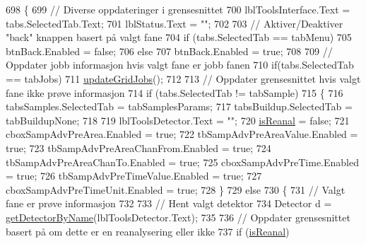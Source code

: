 \begin{DoxyCode}
698         \{
699             \textcolor{comment}{// Diverse oppdateringer i grensesnittet}
700             lblToolsInterface.Text = tabs.SelectedTab.Text;
701             lblStatus.Text = \textcolor{stringliteral}{""};
702 
703             \textcolor{comment}{// Aktiver/Deaktiver "back" knappen basert på valgt fane}
704             \textcolor{keywordflow}{if} (tabs.SelectedTab == tabMenu)
705                 btnBack.Enabled = \textcolor{keyword}{false};
706             \textcolor{keywordflow}{else}
707                 btnBack.Enabled = \textcolor{keyword}{true};
708 
709             \textcolor{comment}{// Oppdater jobb informasjon hvis valgt fane er jobb fanen}
710             \textcolor{keywordflow}{if}(tabs.SelectedTab == tabJobs)
711                 \hyperlink{class_scintilab_1_1_form_main_a26420269c1a616c31de7521deebbef5f}{updateGridJobs}();
712 
713             \textcolor{comment}{// Oppdater grensesnittet hvis valgt fane ikke prøve informasjon}
714             \textcolor{keywordflow}{if} (tabs.SelectedTab != tabSample)
715             \{
716                 tabsSamples.SelectedTab = tabSamplesParams;
717                 tabsBuildup.SelectedTab = tabBuildupNone;
718 
719                 lblToolsDetector.Text = \textcolor{stringliteral}{""};
720                 \hyperlink{class_scintilab_1_1_form_main_a389e9c6697c567d84058d178053a837c}{isReanal} = \textcolor{keyword}{false};
721                 cboxSampAdvPreArea.Enabled = \textcolor{keyword}{true};
722                 tbSampAdvPreAreaValue.Enabled = \textcolor{keyword}{true};
723                 tbSampAdvPreAreaChanFrom.Enabled = \textcolor{keyword}{true};
724                 tbSampAdvPreAreaChanTo.Enabled = \textcolor{keyword}{true};
725                 cboxSampAdvPreTime.Enabled = \textcolor{keyword}{true};
726                 tbSampAdvPreTimeValue.Enabled = \textcolor{keyword}{true};
727                 cboxSampAdvPreTimeUnit.Enabled = \textcolor{keyword}{true};
728             \}
729             \textcolor{keywordflow}{else}
730             \{
731                 \textcolor{comment}{// Valgt fane er prøve informasjon}
732 
733                 \textcolor{comment}{// Hent valgt detektor}
734                 Detector d = \hyperlink{class_scintilab_1_1_form_main_aff4482e0919480013a53fe56cfb374ba}{getDetectorByName}(lblToolsDetector.Text);
735 
736                 \textcolor{comment}{// Oppdater grensesnittet basert på om dette er en reanalysering eller ikke}
737                 \textcolor{keywordflow}{if} (\hyperlink{class_scintilab_1_1_form_main_a389e9c6697c567d84058d178053a837c}{isReanal})

\end{DoxyCode}
